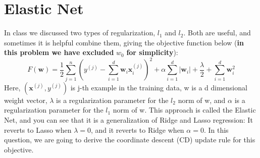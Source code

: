 \documentclass{article}
\renewcommand{\vec}[1]{\boldsymbol{#1}}
\begin{document}
\newpage
\section{Elastic Net}
In class we discussed two types of regularization, $l_1$ and $l_2$. Both are useful, and sometimes it is helpful combine them, giving the objective function below (\textbf{in this problem we have excluded} $w_0$ \textbf{for simplicity}):
\begin{equation}
F(\vec{w}) = \frac{1}{2}\sum^n_{j=1}(y^{(j)}-\sum^d_{i=1}\vec{w}_i\vec{x}_i^{(j)})^2+\alpha\sum^d_{i=1}|\vec{w}_i|+\frac{\lambda}{2}+\sum^d_{i=1}\vec{w}_i^2
\end{equation}
Here, $(\vec{x}^{(j)},y^{(j)})$ is j-th example in the training data, w is a d dimensional weight vector, $\lambda$ is a regularization parameter for the $l_2$ norm of w, and $\alpha$ is a regularization parameter for the $l_1$ norm of w. This approach is called the Elastic Net, and you can see that it is a generalization of Ridge and Lasso regression: It reverts to Lasso when $\lambda = 0$, and it reverts to Ridge when $\alpha = 0$. In this question, we are going to derive the coordinate descent (CD) update rule for this objective.
\end{document}
